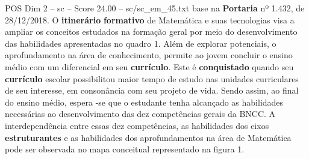 \begin{textsample}{POS Dim 2 – sc – Score 24.00 – sc/sc\_em\_45.txt}
base na \textbf{Portaria} nº 1.432, de 28/12/2018.
O \textbf{itinerário} \textbf{formativo} de Matemática e suas tecnologias visa a ampliar os conceitos estudados na formação geral por meio do desenvolvimento das habilidades apresentadas no quadro 1.
Além de explorar potenciais, o aprofundamento na área de conhecimento, permite ao jovem concluir o ensino médio com um diferencial em seu \textbf{currículo}.
Este é \textbf{conquistado} quando seu \textbf{currículo} escolar possibilitou maior tempo de estudo nas unidades curriculares de seu interesse, em consonância com seu projeto de vida.
Sendo assim, ao final do ensino médio, espera -se que o estudante tenha alcançado as habilidades necessárias ao desenvolvimento das dez competências gerais da BNCC.
A interdependência entre essas dez competências, as habilidades dos eixos \textbf{estruturantes} e as habilidades dos aprofundamentos na área de Matemática pode ser observada no mapa conceitual representado na figura 1.

\end{textsample}
